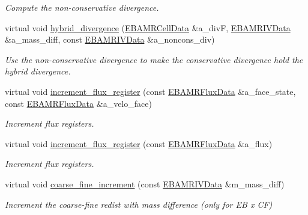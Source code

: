\begin{DoxyCompactItemize}
\begin{DoxyCompactList}\small\item\em Compute the non-\/conservative divergence. \end{DoxyCompactList}\item 
virtual void \hyperlink{classcdr__solver_affbf7c34e2949afcd66c61ceff52b1c1}{hybrid\+\_\+divergence} (\hyperlink{type__definitions_8H_a7e610f301989e5e07781c5e338bdb7c3}{E\+B\+A\+M\+R\+Cell\+Data} \&a\+\_\+divF, \hyperlink{type__definitions_8H_a6b8fa905d55cbb491b52180386f0e0c1}{E\+B\+A\+M\+R\+I\+V\+Data} \&a\+\_\+mass\+\_\+diff, const \hyperlink{type__definitions_8H_a6b8fa905d55cbb491b52180386f0e0c1}{E\+B\+A\+M\+R\+I\+V\+Data} \&a\+\_\+noncons\+\_\+div)
\begin{DoxyCompactList}\small\item\em Use the non-\/conservative divergence to make the conservative divergence hold the hybrid divergence. \end{DoxyCompactList}\item 
virtual void \hyperlink{classcdr__solver_a8788a562c5ff11aa80fc4f60d2b51df6}{increment\+\_\+flux\+\_\+register} (const \hyperlink{type__definitions_8H_aadad278b2e5d3d4abcf9032f90ba78c3}{E\+B\+A\+M\+R\+Flux\+Data} \&a\+\_\+face\+\_\+state, const \hyperlink{type__definitions_8H_aadad278b2e5d3d4abcf9032f90ba78c3}{E\+B\+A\+M\+R\+Flux\+Data} \&a\+\_\+velo\+\_\+face)
\begin{DoxyCompactList}\small\item\em Increment flux registers. \end{DoxyCompactList}\item 
virtual void \hyperlink{classcdr__solver_a874c1883ac9bfa262a0a3977b39914b0}{increment\+\_\+flux\+\_\+register} (const \hyperlink{type__definitions_8H_aadad278b2e5d3d4abcf9032f90ba78c3}{E\+B\+A\+M\+R\+Flux\+Data} \&a\+\_\+flux)
\begin{DoxyCompactList}\small\item\em Increment flux registers. \end{DoxyCompactList}\item 
virtual void \hyperlink{classcdr__solver_a759b736933614b4cad657ac073afcd35}{coarse\+\_\+fine\+\_\+increment} (const \hyperlink{type__definitions_8H_a6b8fa905d55cbb491b52180386f0e0c1}{E\+B\+A\+M\+R\+I\+V\+Data} \&m\+\_\+mass\+\_\+diff)
\begin{DoxyCompactList}\small\item\em Increment the coarse-\/fine redist with mass difference (only for EB x CF) \end{DoxyCompactList}\item 

\end{DoxyCompactItemize}
